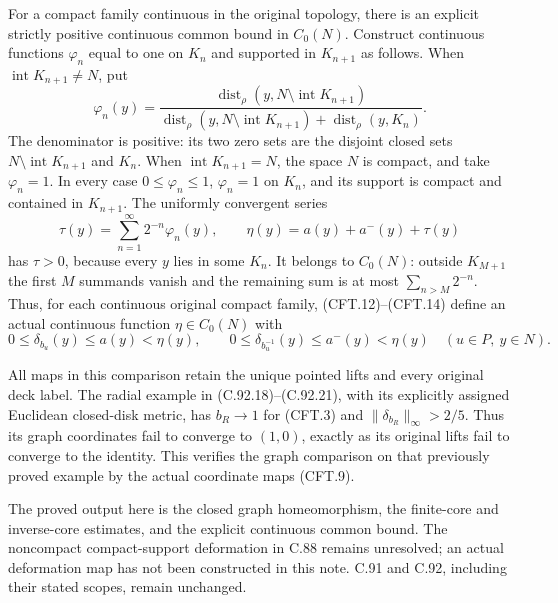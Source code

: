 For a compact family continuous in the original topology,
there is an explicit strictly positive continuous common
bound in $C_0(N)$. Construct continuous functions $\varphi_n$
equal to one on $K_n$ and supported in $K_{n+1}$ as follows.
When $\operatorname{int}K_{n+1}\ne N$, put
\[
 \varphi_n(y)=
 \frac{\operatorname{dist}_\rho(y,N\setminus\operatorname{int}K_{n+1})}
 {\operatorname{dist}_\rho(y,N\setminus\operatorname{int}K_{n+1})
           +\operatorname{dist}_\rho(y,K_n)}.
                                                               \tag{CFT.13}
\]
The denominator is positive: its two zero sets are the
disjoint closed sets $N\setminus\operatorname{int}K_{n+1}$
and $K_n$. When $\operatorname{int}K_{n+1}=N$, the space $N$
is compact, and take $\varphi_n=1$. In every case
$0\leq\varphi_n\leq1$, $\varphi_n=1$ on $K_n$, and its
support is compact and contained in $K_{n+1}$.
The uniformly convergent series
\[
 \tau(y)=\sum_{n=1}^{\infty}2^{-n}\varphi_n(y),\qquad
 \eta(y)=a(y)+a^-(y)+\tau(y)
                                                               \tag{CFT.14}
\]
has $\tau>0$, because every $y$ lies in some $K_n$.
It belongs to $C_0(N)$: outside $K_{M+1}$ the first $M$
summands vanish and the remaining sum is at most
$\sum_{n>M}2^{-n}$. Thus, for each continuous original
compact family, (CFT.12)--(CFT.14) define an actual continuous
function $\eta\in C_0(N)$ with
\[
 0\leq\delta_{b_u}(y)\leq a(y)<\eta(y),\qquad
 0\leq\delta_{b_u^{-1}}(y)\leq a^-(y)<\eta(y)
                  \quad(u\in P,\ y\in N).
                                                               \tag{CFT.15}
\]

All maps in this comparison retain the unique pointed lifts
and every original deck label. The radial example in
(C.92.18)--(C.92.21), with its explicitly assigned Euclidean
closed-disk metric, has $b_R\to1$ for (CFT.3) and
$\|\delta_{b_R}\|_\infty>2/5$. Thus its graph coordinates
fail to converge to $(1,0)$, exactly as its original lifts
fail to converge to the identity. This verifies the graph
comparison on that previously proved example by the actual
coordinate maps (CFT.9).

The proved output here is the closed graph homeomorphism,
the finite-core and inverse-core estimates, and the explicit
continuous common bound. The noncompact compact-support
deformation in C.88 remains unresolved; an actual deformation
map has not been constructed in this note. C.91 and C.92,
including their stated scopes, remain unchanged.
